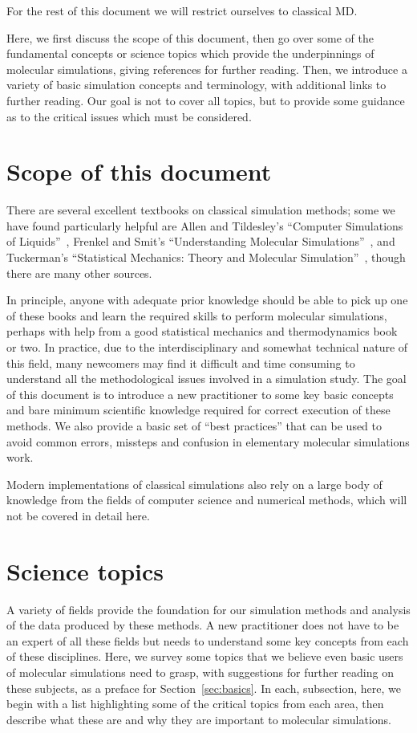 \documentclass[9pt,bestpractices]{livecoms}
\begin{document}
For the rest of this document we will restrict ourselves to classical MD.

Here, we first discuss the scope of this document, then go over some of the fundamental concepts or science topics which provide the underpinnings of molecular simulations, giving references for further reading.
Then, we introduce a variety of basic simulation concepts and terminology, with additional links to further reading.
Our goal is not to cover all topics, but to provide some guidance as to the critical issues which must be considered.

\section{Scope of this document}
\label{sec:scope}

There are several excellent textbooks on classical simulation methods; some we have found particularly helpful are Allen and Tildesley's ``Computer Simulations of Liquids''~\cite{allen_computer_2017}, Frenkel and Smit's ``Understanding Molecular Simulations''~\cite{Frenkel:2001:}, and Tuckerman's ``Statistical Mechanics: Theory and Molecular Simulation''~\cite{Tuckerman:2010:}, though there are many other sources.

In principle, anyone with adequate prior knowledge should be able to pick up one of these books and learn the required skills to perform molecular simulations, perhaps with help from a good statistical mechanics and thermodynamics book or two.
In practice, due to the interdisciplinary and somewhat technical nature of this field, many newcomers may find it difficult and time consuming to understand all the methodological issues involved in a simulation study.  
The goal of this document is to introduce a new practitioner to some key basic concepts and bare minimum scientific knowledge required for correct execution of these methods. 
We also provide a basic set of ``best practices'' that can be used to avoid common errors, missteps and confusion in elementary molecular simulations work.

Modern implementations of classical simulations also rely on a large body of knowledge from the fields of computer science and numerical methods, which will
not be covered in detail here.


\section{Science topics}
\label{sec:science}
A variety of fields provide the foundation for our simulation methods and analysis of the data produced by these methods.
A new practitioner does not have to be an expert of all these fields but needs to understand some key concepts from each of these disciplines.
Here, we survey some topics that we believe even basic users of molecular simulations need to grasp, with suggestions for further reading on these subjects, as a preface for Section~\ref{sec:basics}.
In each, subsection, here, we begin with a list highlighting some of the critical topics from each area, then describe what these are and why they are important to molecular simulations.
\end{document}
